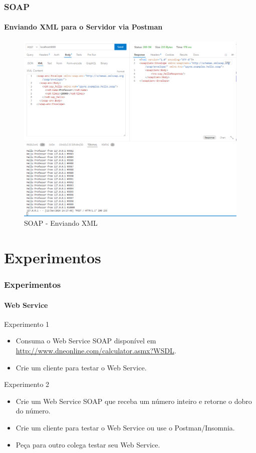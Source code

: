 \documentclass[
	9pt, %
	t, %
]{beamer}
\begin{document}
\begin{frame}[fragile]
	\frametitle{SOAP}
	\framesubtitle{Enviando XML para o Servidor via Postman}
	
	\begin{figure}
		\includegraphics[width=0.7\linewidth]{soap_http_request_example.PNG}
		\caption{SOAP - Enviando XML}
		\label{fig:soap_server_xml_2}
	\end{figure}

\end{frame}

\section{Experimentos}

\begin{frame}
	\frametitle{Experimentos}
	\framesubtitle{Web Service}

	\begin{block}{Experimento 1}
		\begin{itemize}
			\item Consuma o Web Service SOAP disponível em \url{http://www.dneonline.com/calculator.asmx?WSDL}.
			\item Crie um cliente para testar o Web Service.
		\end{itemize}
	\end{block}
	
	\begin{block}{Experimento 2}
		\begin{itemize}
			\item Crie um Web Service SOAP que receba um número inteiro e retorne o dobro do número.
			\item Crie um cliente para testar o Web Service ou use o Postman/Insomnia.
			\item Peça para outro colega testar seu Web Service.
		\end{itemize}
	\end{block}

\end{frame}
\end{document}
